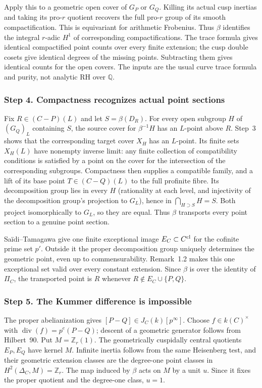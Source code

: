\documentclass[11pt,a4paper]{article}
\begin{document}
Apply this to a geometric open cover of $G_P$ or $G_Q$. Killing
its actual cusp inertias and taking its pro-$r$ quotient recovers
the full pro-$r$ group of its smooth compactification. This is
equivariant for arithmetic Frobenius. Thus $\beta$ identifies
the integral $r$-adic $H^1$ of corresponding compactifications.
The trace formula gives identical compactified point counts over
every finite extension; the cusp double cosets give identical
degrees of the missing points. Subtracting them gives identical
counts for the open covers. The inputs are the usual curve trace
formula and purity, not analytic RH over $\mathbb Q$.

\subsubsection*{Step 4. Compactness recognizes actual point sections}
Fix $R\in(C-P)(L)$ and let $S=\beta(D_R)$. For every open
subgroup $H$ of $(G_Q)_L$ containing $S$, the source cover for
$\beta^{-1}H$ has an $L$-point above $R$. Step~3 shows that the
corresponding target cover $X_H$ has an $L$-point. Its finite
sets $X_H(L)$ have nonempty inverse limit: any finite collection
of compatibility conditions is satisfied by a point on the cover
for the intersection of the corresponding subgroups. Compactness
then supplies a compatible family, and a lift of its base point
$T\in(C-Q)(L)$ to the full profinite fibre. Its decomposition
group lies in every $H$ (rationality at each level, and injectivity
of the decomposition group's projection to $G_L$), hence in
$\bigcap_{H\supset S}H=S$. Both project isomorphically to $G_L$,
so they are equal. Thus $\beta$ transports every point section
to a genuine point section.

Sa\"idi--Tamagawa \cite[Definitions~1.3, 1.5, 1.10 and
Proposition~1.8(vi)]{ST2009} give one finite exceptional image
$E_C\subset C^{\rm cl}$ for the cofinite prime set $p'$.
Outside it the proper decomposition group uniquely determines
the geometric point, even up to commensurability. Remark~1.2
makes this one exceptional set valid over every constant extension.
Since $\beta$ is over the identity of $\Pi_C$, the transported
point is $R$ whenever $R\notin E_C\cup\{P,Q\}$.

\subsubsection*{Step 5. The Kummer difference is impossible}
The proper abelianization gives $[P-Q]\in J_C(k)[p^\infty]$.
Choose $f\in k(C)^\times$ with
$\operatorname{div}(f)=p^e(P-Q)$; descent of a geometric
generator follows from Hilbert~90. Put $M=\mathbb Z_r(1)$.
The geometrically cuspidally central quotients $E_P,E_Q$ have
kernel $M$. Infinite inertia follows from the same Heisenberg
test, and their geometric extension classes are the degree-one
point classes in $H^2(\Delta_C,M)=\mathbb Z_r$.
The map induced by $\beta$ acts on $M$ by a unit $u$.
Since it fixes the proper quotient and the degree-one class,
$u=1$.
\end{document}
